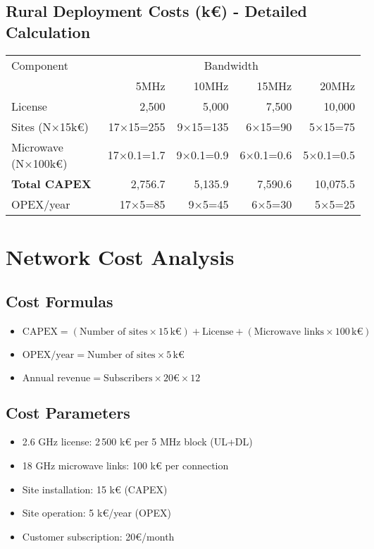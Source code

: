 \documentclass[a4paper,12pt]{article}
\begin{document}
\subsection*{Rural Deployment Costs (k€) - Detailed Calculation}
\begin{center}
\begin{tabular}{lrrrr}
\toprule
Component & \multicolumn{4}{c}{Bandwidth} \\
 & 5MHz & 10MHz & 15MHz & 20MHz \\
\midrule
License & 2,500 & 5,000 & 7,500 & 10,000 \\
Sites (N×15k€) & 17×15=255 & 9×15=135 & 6×15=90 & 5×15=75 \\
Microwave (N×100k€) & 17×0.1=1.7 & 9×0.1=0.9 & 6×0.1=0.6 & 5×0.1=0.5 \\
\midrule
\textbf{Total CAPEX} & 2,756.7 & 5,135.9 & 7,590.6 & 10,075.5 \\
OPEX/year & 17×5=85 & 9×5=45 & 6×5=30 & 5×5=25 \\
\bottomrule
\end{tabular}
\end{center}

\section{Network Cost Analysis}

\subsection*{Cost Formulas}
\begin{itemize}
    \item $\text{CAPEX} = (\text{Number of sites} \times 15\,\text{k€}) + \text{License} + (\text{Microwave links} \times 100\,\text{k€})$
    \item $\text{OPEX/year} = \text{Number of sites} \times 5\,\text{k€}$
    \item $\text{Annual revenue} = \text{Subscribers} \times 20€ \times 12$
\end{itemize}

\subsection*{Cost Parameters}
\begin{itemize}
    \item 2.6 GHz license: 2\,500 k€ per 5 MHz block (UL+DL)
    \item 18 GHz microwave links: 100 k€ per connection
    \item Site installation: 15 k€ (CAPEX)
    \item Site operation: 5 k€/year (OPEX)
    \item Customer subscription: 20€/month
\end{itemize}
\end{document}
